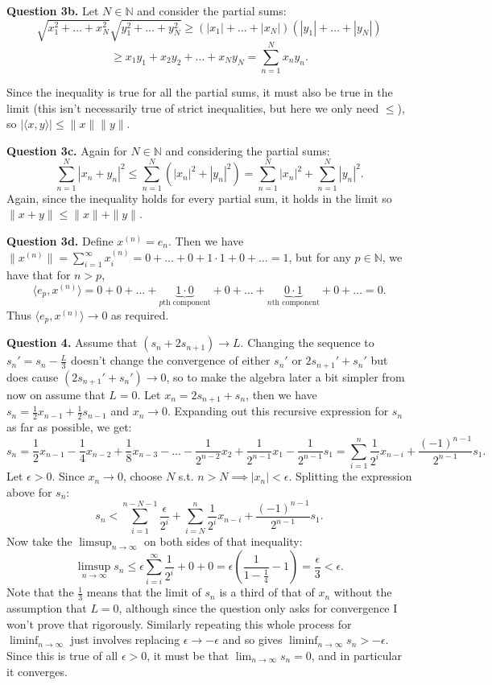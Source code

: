 \documentclass[letterpaper, reqno,11pt]{article}
\begin{document}
{\medskip\noindent\bf Question 3b.} Let $N\in \mathbb{N}$ and consider the partial sums:
\[
\sqrt{x_1^2+\ldots +x_N^2}\sqrt{y_1^2+\ldots+y_N^2}\geq (|x_1|+\ldots +|x_N|)(|y_1|+\ldots+|y_N|)
\]
\[
\geq x_1y_1+x_2 y_2+\ldots +x_Ny_N=\sum_{n=1}^{N}x_ny_n 
.\]

Since the inequality is true for all the partial sums, it must also be true in the limit (this isn't necessarily true of strict inequalities, but here we only need $\leq$), so $\left| \langle x,y\rangle \right| \leq \|x\|\|y\|$.

{\medskip\noindent\bf Question 3c.} Again for $N\in \mathbb{N}$ and considering the partial sums:
\[
\sum_{n=1}^{N}|x_n+y_n|^2\leq \sum_{n=1}^{N}\left(|x_n|^2+|y_n|^2\right)=\sum_{n=1}^{N}|x_n|^2+\sum_{n=1}^{N}|y_n|^2
.\]
Again, since the inequality holds for every partial sum, it holds in the limit so $\|x+y\|\leq \|x\|+\|y\|$.

{\medskip\noindent\bf Question 3d.} Define $x^{(n)}=e_{n}$. Then we have $\|x^{(n)}\|=\sum_{i=1}^{\infty}x_i^{(n)}=0+\ldots+0+1\cdot 1+0+\ldots=1$, but for any $p\in \mathbb{N}$, we have that for $n>p$,
\[
    \langle e_p,x^{(n)}\rangle=0+0+\ldots+\underbrace{1\cdot 0}_{p\text{th component}}+0+\ldots+\underbrace{0\cdot 1}_{n\text{th component}}+0+\ldots=0
.\]
Thus $\langle e_p,x^{(n)}\rangle\to 0$ as required.

\newpage\phantom{blabla}
\newpage

{\medskip\noindent\bf Question 4.} Assume that $(s_n+2s_{n+1})\to L$. Changing the sequence to $s_n'=s_{n}-\frac{L}{3}$ doesn't change the convergence of either $s_n'$ or $2s_{n+1}'+s_n'$ but does cause $(2s_{n+1}'+s_{n}')\to 0$, so to make the algebra later a bit simpler from now on assume that $L=0$. Let $x_n=2s_{n+1}+s_n$, then we have $s_{n}=\frac{1}{2}x_{n-1}+\frac{1}{2}s_{n-1}$ and $x_{n}\to 0$. Expanding out this recursive expression for $s_n$ as far as possible, we get:
\[
    s_n=\frac{1}{2}x_{n-1}-\frac{1}{4}x_{n-2}+\frac{1}{8}x_{n-3}-\ldots-\frac{1}{2^{n-2}}x_2+\frac{1}{2^{n-1}}x_1-\frac{1}{2^{n-1}}s_1=\sum_{i=1}^{n}\frac{1}{2^{i}}x_{n-i}+\frac{(-1)^{n-1}}{2^{n-1}}s_{1}
.\]
Let $\epsilon>0$. Since $x_n\to 0$, choose $N$ s.t. $n>N\implies |x_n|<\epsilon$. Splitting the expression above for $s_n$:
\[
s_n< \sum_{i=1}^{n-N-1} \frac{\epsilon}{2^{i}}+\sum_{i=N}^{n}\frac{1}{2^{i}}x_{n-i}+\frac{(-1)^{n-1}}{2^{n-1}}s_{1}
.\]
Now take the $\limsup_{n\to\infty}$ on both sides of that inequality:
\[
\limsup_{n\to\infty}s_n\leq \epsilon \sum_{i=i}^{\infty}\frac{1}{2^{i}}+0+0=\epsilon\left(\frac{1}{1-\frac{1}{4}}-1\right)=\frac{\epsilon}{3}<\epsilon
.\]
Note that the $\frac{1}{3}$ means that the limit of $s_n$ is a third of that of $x_n$ without the assumption that $L=0$, although since the question only asks for convergence I won't prove that rigorously. Similarly repeating this whole process for $\liminf_{n\to\infty}$ just involves replacing $\epsilon\to -\epsilon$ and so gives $\liminf_{n\to\infty}s_n> -\epsilon$. Since this is true of all $\epsilon>0$, it must be that $\lim_{n\to\infty}s_n=0$, and in particular it converges.
\end{document}
